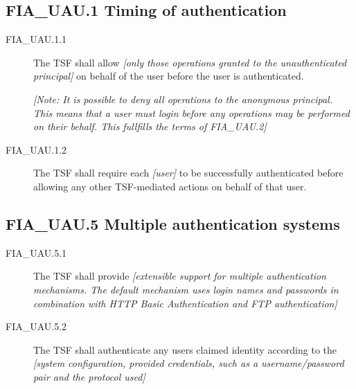 \documentclass[10pt,a4paper,english]{scrbook}
\begin{document}
\hypertarget{fia-uau-1-timing-of-authentication}{}
\subsection{FIA{\_}UAU.1 Timing of authentication}
\begin{description}
\item[FIA{\_}UAU.1.1 ]

The TSF shall allow \emph{{[}only those operations granted to the
unauthenticated principal]} on behalf of the user before the user is
authenticated.

\emph{{[}Note: It is possible to deny all operations to the anonymous
principal. This means that a user must login before any operations may
be performed on their behalf. This fullfills the terms of FIA{\_}UAU.2]}

\item[FIA{\_}UAU.1.2 ]

The TSF shall require each \emph{{[}user]} to be successfully
authenticated before allowing any other TSF-mediated actions on behalf
of that user.

\end{description}



\hypertarget{fia-uau-5-multiple-authentication-systems}{}
\subsection{FIA{\_}UAU.5 Multiple authentication systems}
\begin{description}
\item[FIA{\_}UAU.5.1 ]

The TSF shall provide \emph{{[}extensible support for multiple
authentication mechanisms. The default mechanism uses login names
and passwords in combination with HTTP Basic Authentication and FTP
authentication]}

\item[FIA{\_}UAU.5.2]

The TSF shall authenticate any users claimed identity according to
the \emph{{[}system configuration, provided credentials, such as a
username/password pair and the protocol used]}

\end{description}
\end{document}
